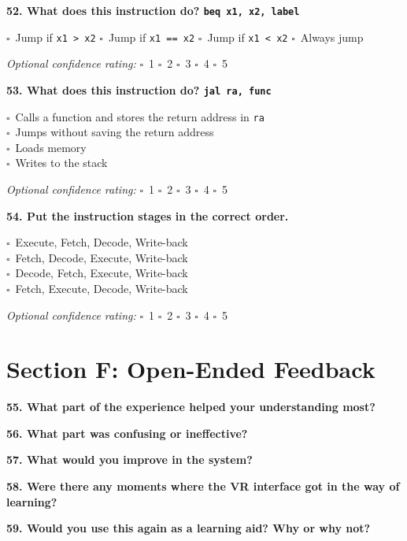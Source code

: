 \documentclass[12pt,a4paper]{article}
\newcommand{\boxmark}{\(\square\)}
\newcommand{\lineanswer}{\vspace{2.5em}\hrulefill}
\newcommand{\confidenceoptional}{%
    \textit{Optional confidence rating:} \boxmark\ 1 \hspace{1em} \boxmark\ 2 \hspace{1em} \boxmark\ 3 \hspace{1em} \boxmark\ 4 \hspace{1em} \boxmark\ 5
}
\begin{document}
\textbf{52. What does this instruction do? \texttt{beq x1, x2, label}}

\boxmark\ Jump if \texttt{x1 > x2} \hspace{1em}
\boxmark\ Jump if \texttt{x1 == x2} \hspace{1em}
\boxmark\ Jump if \texttt{x1 < x2} \hspace{1em}
\boxmark\ Always jump

\confidenceoptional

\textbf{53. What does this instruction do? \texttt{jal ra, func}}

\boxmark\ Calls a function and stores the return address in \texttt{ra}\\
\boxmark\ Jumps without saving the return address\\
\boxmark\ Loads memory\\
\boxmark\ Writes to the stack

\confidenceoptional

\textbf{54. Put the instruction stages in the correct order.}

\boxmark\ Execute, Fetch, Decode, Write-back\\
\boxmark\ Fetch, Decode, Execute, Write-back\\
\boxmark\ Decode, Fetch, Execute, Write-back\\
\boxmark\ Fetch, Execute, Decode, Write-back

\confidenceoptional

\section*{Section F: Open-Ended Feedback}

\textbf{55. What part of the experience helped your understanding most?}
\lineanswer

\textbf{56. What part was confusing or ineffective?}
\lineanswer

\textbf{57. What would you improve in the system?}
\lineanswer

\textbf{58. Were there any moments where the VR interface got in the way of learning?}
\lineanswer

\textbf{59. Would you use this again as a learning aid? Why or why not?}

\vspace{4em}
\hrulefill
\end{document}
